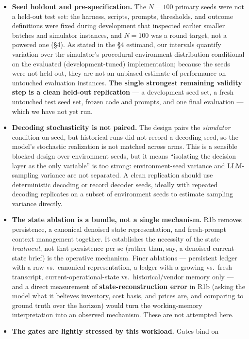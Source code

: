 \documentclass[11pt]{article}
\begin{document}
\begin{itemize}
\item \textbf{Seed holdout and pre-specification.} The $N=100$ primary seeds
were not a held-out test set: the harness, scripts, prompts, thresholds, and
outcome definitions were fixed during development that inspected earlier smaller
batches and simulator instances, and $N=100$ was a round target, not a powered
one (\S4). As stated in the \S4 estimand, our intervals quantify variation over
the simulator's procedural environment distribution conditional on the
evaluated (development-tuned) implementation; because the seeds were not held
out, they are not an unbiased estimate of performance on untouched evaluation
instances. \textbf{The single strongest remaining validity step is a clean
held-out replication} --- a development seed set, a fresh untouched test seed
set, frozen code and prompts, and one final evaluation --- which we have not yet
run.
\item \textbf{Decoding stochasticity is not paired.} The design pairs the
\emph{simulator} condition on seed, but historical runs did not record a
decoding seed, so the model's stochastic realization is not matched across arms.
This is a sensible blocked design over environment seeds, but it means
``isolating the decision layer as the only variable'' is too strong:
environment-seed variance and LLM-sampling variance are not separated. A clean
replication should use deterministic decoding or record decoder seeds, ideally
with repeated decoding replicates on a subset of environment seeds to estimate
sampling variance directly.
\item \textbf{The state ablation is a bundle, not a single mechanism.} R1b
removes persistence, a canonical denoised state representation, and fresh-prompt
context management together. It establishes the necessity of the state
\emph{treatment}, not that persistence per se (rather than, say, a denoised
current-state brief) is the operative mechanism. Finer ablations --- persistent
ledger with a raw vs.\ canonical representation, a ledger with a growing vs.\
fresh transcript, current-operational-state vs.\ historical/vendor memory only
--- and a direct measurement of \textbf{state-reconstruction error} in R1b
(asking the model what it believes inventory, cost basis, and prices are, and
comparing to ground truth over the horizon) would turn the working-memory
interpretation into an observed mechanism. These are not attempted here.
\item \textbf{The gates are lightly stressed by this workload.} Gates bind on

\end{itemize}
\end{document}
